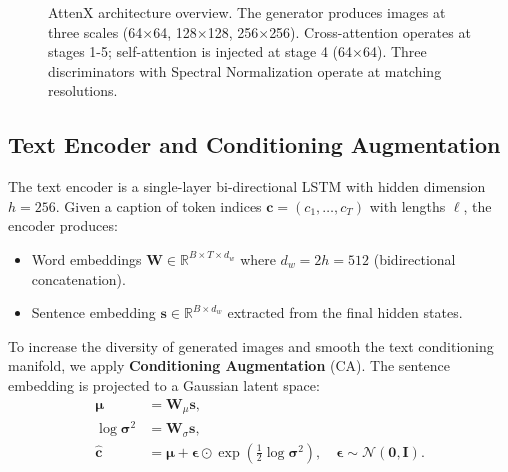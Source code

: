 \documentclass[conference]{IEEEtran}
\begin{document}
\begin{figure}[htbp]
\centering
{}
\caption{AttenX architecture overview. The generator produces images at three scales (64$\times$64, 128$\times$128, 256$\times$256). Cross-attention operates at stages 1-5; self-attention is injected at stage 4 (64$\times$64). Three discriminators with Spectral Normalization operate at matching resolutions.}
\label{fig:architecture}
\end{figure}

\subsection{Text Encoder and Conditioning Augmentation}
\label{sec:ca}

The text encoder is a single-layer bi-directional LSTM with hidden dimension $h=256$. Given a caption of token indices $\mathbf{c} = (c_1, \dots, c_T)$ with lengths $\ell$, the encoder produces:
\begin{itemize}
    \item Word embeddings $\mathbf{W} \in \mathbb{R}^{B \times T \times d_w}$ where $d_w = 2h = 512$ (bidirectional concatenation).
    \item Sentence embedding $\mathbf{s} \in \mathbb{R}^{B \times d_w}$ extracted from the final hidden states.
\end{itemize}

To increase the diversity of generated images and smooth the text conditioning manifold, we apply \textbf{Conditioning Augmentation} (CA). The sentence embedding is projected to a Gaussian latent space:
\begin{align}
    \boldsymbol{\mu} &= \mathbf{W}_\mu \mathbf{s}, \\
    \log \boldsymbol{\sigma}^2 &= \mathbf{W}_\sigma \mathbf{s}, \\
    \hat{\mathbf{c}} &= \boldsymbol{\mu} + \boldsymbol{\epsilon} \odot \exp(\tfrac{1}{2}\log \boldsymbol{\sigma}^2), \quad \boldsymbol{\epsilon} \sim \mathcal{N}(\mathbf{0}, \mathbf{I}).
\end{align}
\end{document}

